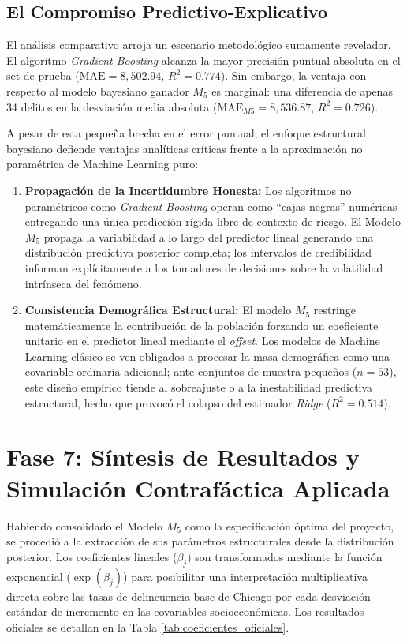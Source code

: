 \documentclass[11pt,a4paper]{article}
\begin{document}
\subsection{El Compromiso Predictivo-Explicativo}
El análisis comparativo arroja un escenario metodológico sumamente revelador. El algoritmo \textit{Gradient Boosting} alcanza la mayor precisión puntual absoluta en el set de prueba ($\text{MAE} = 8{,}502.94$, $R^2 = 0.774$). Sin embargo, la ventaja con respecto al modelo bayesiano ganador $M_5$ es marginal: una diferencia de apenas 34 delitos en la desviación media absoluta ($\text{MAE}_{M5} = 8{,}536.87$, $R^2 = 0.726$).

A pesar de esta pequeña brecha en el error puntual, el enfoque estructural bayesiano defiende ventajas analíticas críticas frente a la aproximación no paramétrica de Machine Learning puro:
\begin{enumerate}
    \item \textbf{Propagación de la Incertidumbre Honesta:} Los algoritmos no paramétricos como \textit{Gradient Boosting} operan como ``cajas negras'' numéricas entregando una única predicción rígida libre de contexto de riesgo. El Modelo $M_5$ propaga la variabilidad a lo largo del predictor lineal generando una distribución predictiva posterior completa; los intervalos de credibilidad informan explícitamente a los tomadores de decisiones sobre la volatilidad intrínseca del fenómeno.
    \item \textbf{Consistencia Demográfica Estructural:} El modelo $M_5$ restringe matemáticamente la contribución de la población forzando un coeficiente unitario en el predictor lineal mediante el \textit{offset}. Los modelos de Machine Learning clásico se ven obligados a procesar la masa demográfica como una covariable ordinaria adicional; ante conjuntos de muestra pequeños ($n = 53$), este diseño empírico tiende al sobreajuste o a la inestabilidad predictiva estructural, hecho que provocó el colapso del estimador \textit{Ridge} ($R^2 = 0.514$).
\end{enumerate}

\section{Fase 7: Síntesis de Resultados y Simulación Contrafáctica Aplicada}
Habiendo consolidado el Modelo $M_5$ como la especificación óptima del proyecto, se procedió a la extracción de sus parámetros estructurales desde la distribución posterior. Los coeficientes lineales ($\beta_j$) son transformados mediante la función exponencial ($\exp(\beta_j)$) para posibilitar una interpretación multiplicativa directa sobre las tasas de delincuencia base de Chicago por cada desviación estándar de incremento en las covariables socioeconómicas. Los resultados oficiales se detallan en la Tabla \ref{tab:coeficientes_oficiales}.
\end{document}
